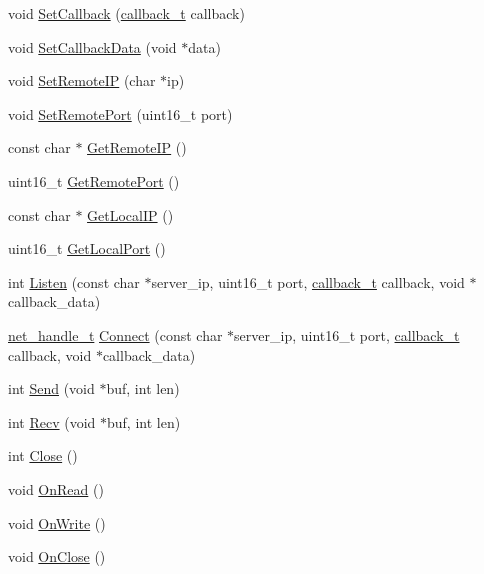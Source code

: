 \begin{DoxyCompactItemize}
\item 
void \hyperlink{class_c_base_socket_afd663f9a74d47ddf732115c8cbfde08b}{Set\+Callback} (\hyperlink{msfs_2include_2common_2ostype_8h_a126e68a4e9bb7ecb6c88b2eeb66a0ee7}{callback\+\_\+t} callback)
\item 
void \hyperlink{class_c_base_socket_a7b157b0848d2d2c317d36c1bd947db2e}{Set\+Callback\+Data} (void $\ast$data)
\item 
void \hyperlink{class_c_base_socket_a50368e1e128ed2659bdfea7d5db49364}{Set\+Remote\+I\+P} (char $\ast$ip)
\item 
void \hyperlink{class_c_base_socket_aed856b547dcbd071746dfcafe6bd07df}{Set\+Remote\+Port} (uint16\+\_\+t port)
\item 
const char $\ast$ \hyperlink{class_c_base_socket_ab67e2d8ea84d36dfddc3975460727adc}{Get\+Remote\+I\+P} ()
\item 
uint16\+\_\+t \hyperlink{class_c_base_socket_a12c343b70b478d8f7e094dd91d4dafb2}{Get\+Remote\+Port} ()
\item 
const char $\ast$ \hyperlink{class_c_base_socket_adc18d9100f4e1981a092c964444f62bd}{Get\+Local\+I\+P} ()
\item 
uint16\+\_\+t \hyperlink{class_c_base_socket_af2accbbe419f28919c31b7e5131ae083}{Get\+Local\+Port} ()
\item 
int \hyperlink{class_c_base_socket_aed79eecacc5111f43a459029eebba2dc}{Listen} (const char $\ast$server\+\_\+ip, uint16\+\_\+t port, \hyperlink{msfs_2include_2common_2ostype_8h_a126e68a4e9bb7ecb6c88b2eeb66a0ee7}{callback\+\_\+t} callback, void $\ast$callback\+\_\+data)
\item 
\hyperlink{base_2ostype_8h_a5e1697fa312aa00ac7305460abf166fd}{net\+\_\+handle\+\_\+t} \hyperlink{class_c_base_socket_abd9522218179b5a4a9aa46cafedde0a4}{Connect} (const char $\ast$server\+\_\+ip, uint16\+\_\+t port, \hyperlink{msfs_2include_2common_2ostype_8h_a126e68a4e9bb7ecb6c88b2eeb66a0ee7}{callback\+\_\+t} callback, void $\ast$callback\+\_\+data)
\item 
int \hyperlink{class_c_base_socket_aecaf1a6f668cadf938b6e386d6f274f5}{Send} (void $\ast$buf, int len)
\item 
int \hyperlink{class_c_base_socket_aac275b1f4cbdc77f100c1fb04888ba24}{Recv} (void $\ast$buf, int len)
\item 
int \hyperlink{class_c_base_socket_acc1d5334e2c121a7705e84af536544c9}{Close} ()
\item 
void \hyperlink{class_c_base_socket_afa0c274f4b6d711099f2fca02e0237b9}{On\+Read} ()
\item 
void \hyperlink{class_c_base_socket_ab919914415b76a3441dc9f2cb6a134de}{On\+Write} ()
\item 
void \hyperlink{class_c_base_socket_a18a3b1766f29c232018ec02502240e4f}{On\+Close} ()
\end{DoxyCompactItemize}
